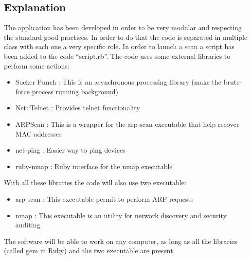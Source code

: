 \documentclass{report}
\begin{document}
\subsection{Explanation}
The application has been developed in order to be very modular and respecting the standard good practices. In order to do that the code is separated in multiple class with each one a very specific role. In order to launch a scan a script has been added to the code ``script.rb''.\newline
The code uses some external libraries to perform some actions:
\begin{itemize}
 \item Sucker Punch \autocite{suckerpunch}: This is an asynchronous processing library (make the brute-force process running background)
 \item Net::Telnet \autocite{nettelnet}: Provides telnet functionality
 \item ARPScan \autocite{arpscan}: This is a wrapper for the arp-scan executable that help recover MAC addresses
 \item net-ping \autocite{netping}: Easier way to ping devices
 \item ruby-nmap \autocite{rubynmap}: Ruby interface for the nmap executable
\end{itemize}
With all these libraries the code will also use two executable:
\begin{itemize}
 \item arp-scan \autocite{arp-scan}: This executable permit to perform ARP requests
 \item nmap \autocite{nmap}: This executable is an utility for network discovery and security auditing
\end{itemize}
The software will be able to work on any computer, as long as all the libraries (called gem in Ruby) and the two executable are present.
\end{document}
